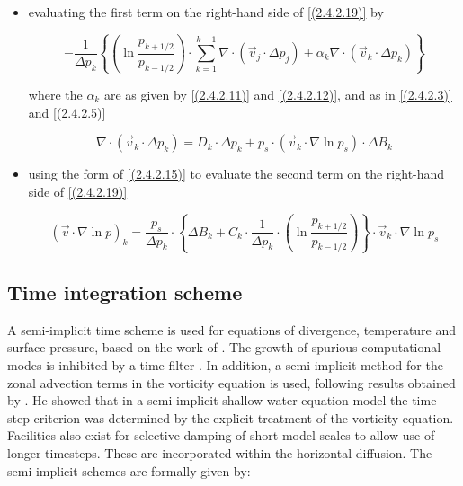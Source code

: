 \begin{itemize}

\item evaluating the first term on the right-hand side of \ref{(2.4.2.19)} by

\begin{equation}
-\frac{1}{\Delta p_k}\left\{\left(\ln{\frac{p_{k+1/2}}{p_{k-1/2}}}\right)
\cdot \sum\limits^{k-1}_{k=1}\nabla\cdot(\vec{v}_j\cdot\Delta p_j) 
+ \alpha_k \nabla\cdot (\vec{v}_k\cdot\Delta p_k)\right\}
\label{(2.4.2.20)}
\end{equation}

where the $\alpha_k$ are as given by \ref{(2.4.2.11)} and  \ref{(2.4.2.12)},
and as in  \ref{(2.4.2.3)} and  \ref{(2.4.2.5)}

\begin{equation}
\nabla\cdot (\vec{v}_k\cdot\Delta p_k) = D_k \cdot\Delta p_k
+ p_s\cdot (\vec{v}_k\cdot\nabla\ln p_s)\cdot\Delta B_k
\label{(2.4.2.21)}
\end{equation}

\item using the form of \ref{(2.4.2.15)} to evaluate the second term on the right-hand side of \ref{(2.4.2.19)}

\begin{equation}
(\vec{v}\cdot\nabla\ln p)_k = \frac{p_s}{\Delta p_k}
\cdot\left\{\Delta B_k + C_k \cdot \frac{1}{\Delta p_k}
\cdot \left(\ln{\frac{p_{k+1/2}}{p_{k-1/2}}}\right)\right\}
\cdot\vec{v}_k\cdot\nabla\ln p_s
\label{(2.4.2.22)}
\end{equation}
\end{itemize}

\subsection{Time integration scheme} 

A semi-implicit time scheme is used for equations of divergence,
temperature and surface pressure, based on the work of
\cite{robert72}. The growth of spurious computational modes is
inhibited by a time filter \cite[]{asselin72}. In addition, a
semi-implicit method for the zonal advection terms in the vorticity
equation is used, following results obtained by
\cite{robert81,robert82}. He showed that in a semi-implicit shallow
water equation model the time-step criterion was determined by the
explicit treatment of the vorticity equation. Facilities also exist
for selective damping of short model scales to allow use of longer
timesteps. 
These are incorporated within the horizontal diffusion.
The semi-implicit schemes are formally given by:


